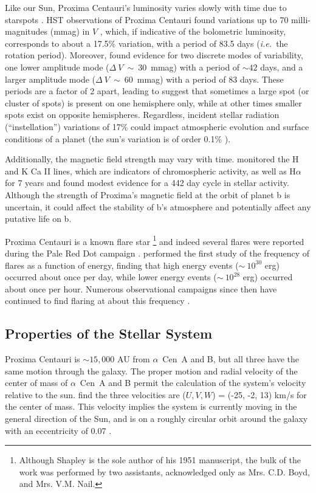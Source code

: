 \documentclass[preprint,12pt]{aastex}
\def\ie{{\it i.e.\ }}
\def\acen{{$\alpha$~Cen}}
\begin{document}
Like our Sun, Proxima Centauri's luminosity varies slowly with time
due to starspots \citep{Benedict93}. HST observations of Proxima
Centauri found variations up to 70 milli-magnitudes (mmag) in $V$
\citep{Benedict98}, which, if indicative of the bolometric luminosity,
corresponds to about a 17.5\% variation, with a
period of 83.5 days (\ie the rotation period). Moreover,
\cite{Benedict98} found evidence for two discrete modes of
variability, one lower amplitude mode ($\Delta~V~\sim~30$~mmag) with a
period of $\sim 42$ days, and a larger amplitude mode
($\Delta~V~\sim~60$~mmag) with a period of 83 days. These periods are
a factor of 2 apart, leading \cite{Benedict98} to suggest that
sometimes a large spot (or cluster of spots) is present on one
hemisphere only, while at other times smaller spots exist on opposite
hemispheres. Regardless, incident stellar radiation (``instellation'')
variations of 17\% could impact atmospheric evolution and surface
conditions of a planet (the sun's variation is of order 0.1\%
\citep{Willson81}).

Additionally, the magnetic field strength may vary with
time. \cite{Cincunegui07} monitored the H and K Ca II lines, which are
indicators of chromospheric activity, as well as H$\alpha$ for 7 years
and found modest evidence for a 442 day cycle in stellar
activity. Although the strength of Proxima's magnetic field at the
orbit of planet b is uncertain, it could affect the stability of
b's atmosphere and potentially affect any putative life on b. 

Proxima Centauri is a known flare star
\citep{Shapley51}\footnote{Although Shapley is the sole author of his
  1951 manuscript, the bulk of the work was performed by two 
  assistants, acknowledged only as Mrs. C.D. Boyd, and Mrs. V.M. Nail.}  and indeed several flares
were reported during the Pale Red Dot campaign
\citep{AngladaEscude16}. \cite{Walker81} performed the first study of
the frequency of flares as a function of energy, finding that high
energy events ($\sim~10^{30}$ erg) occurred about once per day, while
lower energy events ($\sim~10^{28}$ erg) occurred about once per
hour. Numerous observational campaigns since then have continued to
find flaring at about this frequency
\citep{Benedict98,AngladaEscude16,Davenport16}.

\subsection{Properties of the Stellar System}
\label{sec:obs:stellarsys}
Proxima Centauri is $\sim 15,000$ AU from \acen~A and B, but all three
have the same motion through the galaxy. The proper motion and radial
velocity of the center of mass of \acen~A and B permit the calculation
of the system's velocity relative to the sun. \cite{Poveda96} find the
three velocities are ($U, V, W$) = (-25, -2, 13) km/s for the center
of mass. This velocity implies the system is currently moving in the
general direction of the Sun, and is on a roughly circular orbit around the galaxy with an
eccentricity of 0.07 \citep{AllenHerrera98}.
\end{document}
